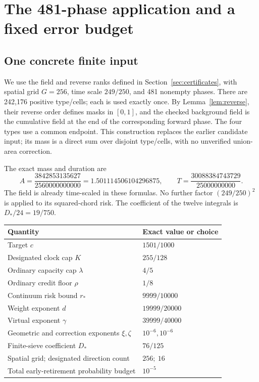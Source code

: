 \section{The 481-phase application and a fixed error budget}\label{sec:numerics}

\subsection{One concrete finite input}
We use the field and reverse ranks defined in Section~\ref{sec:certificates},
with spatial grid \(G=256\), time scale \(249/250\), and 481 nonempty phases.
There are 242,176 positive type/cells; each is used exactly once. By
Lemma~\ref{lem:reverse}, their reverse order defines masks in \([0,1]\),
and the checked background field is the cumulative field at the end of
the corresponding forward phase. The four types use a common endpoint.
This construction replaces the earlier candidate input; its mass is a
direct sum over disjoint type/cells, with no unverified union-area correction.

The exact mass and duration are
\begin{equation}\label{eq:input481numbers}
 A=\frac{3842853135627}{2560000000000}=1.501114506104296875,
 \qquad T=\frac{30088384743729}{25000000000}.
\end{equation}
The field is already time-scaled in these formulas. No further factor
\((249/250)^2\) is applied to its squared-chord risk. The coefficient
of the twelve integrals is \(D_*/24=19/750\).

\begin{center}
\begin{tabular}{@{}ll@{}}
\toprule
Quantity & Exact value or choice\\
\midrule
Target \(c\) & \(1501/1000\)\\
Designated clock cap \(K\) & \(255/128\)\\
Ordinary capacity cap \(\lambda\) & \(4/5\)\\
Ordinary credit floor \(\rho\) & \(1/8\)\\
Continuum risk bound \(r_*\) & \(9999/10000\)\\
Weight exponent \(d\) & \(19999/20000\)\\
Virtual exponent \(\gamma\) & \(39999/40000\)\\
Geometric and correction exponents \(\xi,\zeta\) & \(10^{-6},10^{-6}\)\\
Finite-sieve coefficient \(D_*\) & \(76/125\)\\
Spatial grid; designated direction count & \(256;\ 16\)\\
Total early-retirement probability budget & \(10^{-5}\)\\
\bottomrule
\end{tabular}
\end{center}

